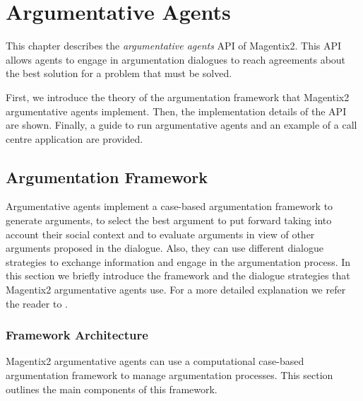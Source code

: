 
\chapter{Argumentative Agents}
\label{sec:introductionArgAgents}
This chapter describes the \emph{argumentative agents} API of Magentix2. This API allows agents to engage in argumentation dialogues to reach agreements about the best solution for a problem that must be solved.

First, we introduce the theory of the argumentation framework that Magentix2 argumentative agents implement. Then, the implementation details of the API are shown. Finally, a guide to run argumentative agents and an example of a call centre application are provided.

\section{Argumentation Framework}

Argumentative agents implement a case-based argumentation framework to generate arguments, to select the best argument to put forward taking into account their social context and to evaluate arguments in view of other arguments proposed in the dialogue. Also, they can use different dialogue strategies to exchange information and engage in the argumentation process. In this section we briefly introduce the framework and the dialogue strategies that Magentix2 argumentative agents use. For a more detailed explanation we refer the reader to \cite{Heras11}.

\subsection{Framework Architecture}
\label{subsubsec:framework}
Magentix2 argumentative agents can use a computational case-based argumentation framework to manage argumentation processes. This section outlines the main components of this framework.

